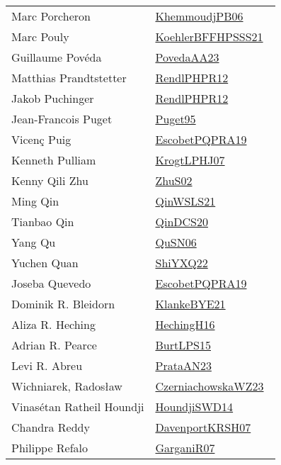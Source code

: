 {\begin{longtable}{p{4cm}p{20cm}}
Marc Porcheron & \href{works/KhemmoudjPB06.pdf}{KhemmoudjPB06}~\cite{KhemmoudjPB06}\\
Marc Pouly & \href{works/KoehlerBFFHPSSS21.pdf}{KoehlerBFFHPSSS21}~\cite{KoehlerBFFHPSSS21}\\
Guillaume Pov{\'{e}}da & \href{works/PovedaAA23.pdf}{PovedaAA23}~\cite{PovedaAA23}\\
Matthias Prandtstetter & \href{works/RendlPHPR12.pdf}{RendlPHPR12}~\cite{RendlPHPR12}\\
Jakob Puchinger & \href{works/RendlPHPR12.pdf}{RendlPHPR12}~\cite{RendlPHPR12}\\
Jean{-}Francois Puget & \href{works/Puget95.pdf}{Puget95}~\cite{Puget95}\\
Vicen{\c{c}} Puig & \href{works/EscobetPQPRA19.pdf}{EscobetPQPRA19}~\cite{EscobetPQPRA19}\\
Kenneth Pulliam & \href{works/KrogtLPHJ07.pdf}{KrogtLPHJ07}~\cite{KrogtLPHJ07}\\
Kenny Qili Zhu & \href{works/ZhuS02.pdf}{ZhuS02}~\cite{ZhuS02}\\
Ming Qin & \href{works/QinWSLS21.pdf}{QinWSLS21}~\cite{QinWSLS21}\\
Tianbao Qin & \href{works/QinDCS20.pdf}{QinDCS20}~\cite{QinDCS20}\\
Yang Qu & \href{works/QuSN06.pdf}{QuSN06}~\cite{QuSN06}\\
Yuchen Quan & \href{}{ShiYXQ22}~\cite{ShiYXQ22}\\
Joseba Quevedo & \href{works/EscobetPQPRA19.pdf}{EscobetPQPRA19}~\cite{EscobetPQPRA19}\\
Dominik R. Bleidorn & \href{works/KlankeBYE21.pdf}{KlankeBYE21}~\cite{KlankeBYE21}\\
Aliza R. Heching & \href{works/HechingH16.pdf}{HechingH16}~\cite{HechingH16}\\
Adrian R. Pearce & \href{works/BurtLPS15.pdf}{BurtLPS15}~\cite{BurtLPS15}\\
Levi R. Abreu & \href{works/PrataAN23.pdf}{PrataAN23}~\cite{PrataAN23}\\
Wichniarek, Radosław & \href{works/CzerniachowskaWZ23.pdf}{CzerniachowskaWZ23}~\cite{CzerniachowskaWZ23}\\
Vinas{\'{e}}tan Ratheil Houndji & \href{works/HoundjiSWD14.pdf}{HoundjiSWD14}~\cite{HoundjiSWD14}\\
Chandra Reddy & \href{works/DavenportKRSH07.pdf}{DavenportKRSH07}~\cite{DavenportKRSH07}\\
Philippe Refalo & \href{works/GarganiR07.pdf}{GarganiR07}~\cite{GarganiR07}\\

\end{longtable}}
